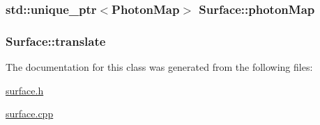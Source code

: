 \subsubsection[{\texorpdfstring{photon\+Map}{photonMap}}]{\setlength{\rightskip}{0pt plus 5cm}std\+::unique\+\_\+ptr$<${\bf Photon\+Map}$>$ Surface\+::photon\+Map}\hypertarget{classSurface_aa624ee597db52c7c8f341e5a31b9e279}{}\label{classSurface_aa624ee597db52c7c8f341e5a31b9e279}
\subsubsection[{\texorpdfstring{translate}{translate}}]{ Surface\+::translate}\hypertarget{classSurface_a442734b024ed1013878d098d27ade6ad}{}\label{classSurface_a442734b024ed1013878d098d27ade6ad}


The documentation for this class was generated from the following files\+:\begin{DoxyCompactItemize}
\item 
\hyperlink{surface_8h}{surface.\+h}\item 
\hyperlink{surface_8cpp}{surface.\+cpp}\end{DoxyCompactItemize}
